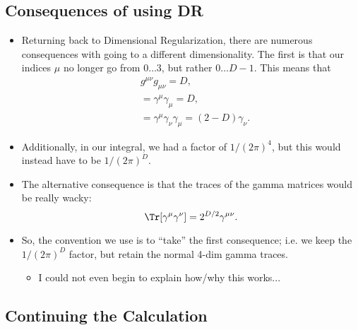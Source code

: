 \subsection*{Consequences of using DR}

\begin{itemize}
    \item Returning back to Dimensional Regularization, there are numerous consequences with going to a different dimensionality. The first is that our indices $\mu$ no longer go from $0\ldots3$, but rather $0\ldots D-1$. This means that
        \begin{align*}
            &g^{\mu\nu}g_{\mu\nu} = D, \\
            &= \gamma^{\mu}\gamma_{\mu} = D, \\
            &= \gamma^{\mu}\gamma_{\nu}\gamma_{\mu} = (2-D)\gamma_{\nu}.
        \end{align*}
    \item Additionally, in our integral, we had a factor of $1/(2\pi)^4$, but this would instead have to be $1/(2\pi)^D$.
    \item The alternative consequence is that the traces of the gamma matrices would be really wacky:
        \begin{equation*}
            \Tr[\gamma^{\mu}\gamma^{\nu}] = 2^{D/2}\gamma^{\mu\nu}.
        \end{equation*}
    \item So, the convention we use is to ``take'' the first consequence; i.e. we keep the $1/(2\pi)^D$ factor, but retain the normal 4-dim gamma traces.
        \begin{itemize}
            \item I could not even begin to explain how/why this works...
        \end{itemize}
\end{itemize}



\subsection*{Continuing the Calculation}


